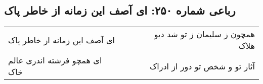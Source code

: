 \begin{center}
\section*{رباعی شماره ۲۵۰: ای آصف این زمانه از خاطر پاک}
\label{sec:sh250}
\begin{longtable}{l p{0.5cm} r}
ای آصف این زمانه از خاطر پاک
&&
همچون ز سلیمان ز تو شد دیو هلاک
\\
ای همچو فرشته اندری عالم خاک
&&
آثار تو و شخص تو دور از ادراک
\\
\end{longtable}
\end{center}
